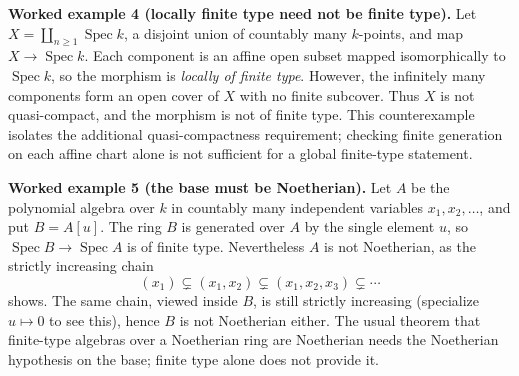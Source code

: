 \par\medskip
\noindent\textbf{Worked example 4 (locally finite type need not be finite type).}
Let $X=\coprod_{n\ge1}\operatorname{Spec}k$, a disjoint union
of countably many $k$-points, and map $X\to\operatorname{Spec}k$.
Each component is an affine open subset mapped isomorphically to
$\operatorname{Spec}k$, so the morphism is \emph{locally of finite type}.
However, the infinitely many components form an open cover of $X$
with no finite subcover.  Thus $X$ is not quasi-compact, and the
morphism is not of finite type.
This counterexample isolates the additional quasi-compactness
requirement; checking finite generation on each affine chart alone
is not sufficient for a global finite-type statement.

\par\medskip
\noindent\textbf{Worked example 5 (the base must be Noetherian).}
Let $A$ be the polynomial algebra over $k$ in countably many
independent variables $x_1,x_2,\ldots$, and put $B=A[u]$.
The ring $B$ is generated over $A$ by the single element $u$,
so $\operatorname{Spec}B\to\operatorname{Spec}A$ is of finite type.
Nevertheless $A$ is not Noetherian, as the strictly increasing
chain
\[
(x_1)\subsetneq(x_1,x_2)\subsetneq(x_1,x_2,x_3)
\subsetneq\cdots
\]
shows.  The same chain, viewed inside $B$, is still strictly
increasing (specialize $u\mapsto0$ to see this), hence $B$ is not
Noetherian either.  The usual theorem that finite-type algebras
over a Noetherian ring are Noetherian needs the Noetherian
hypothesis on the base; finite type alone does not provide it.
